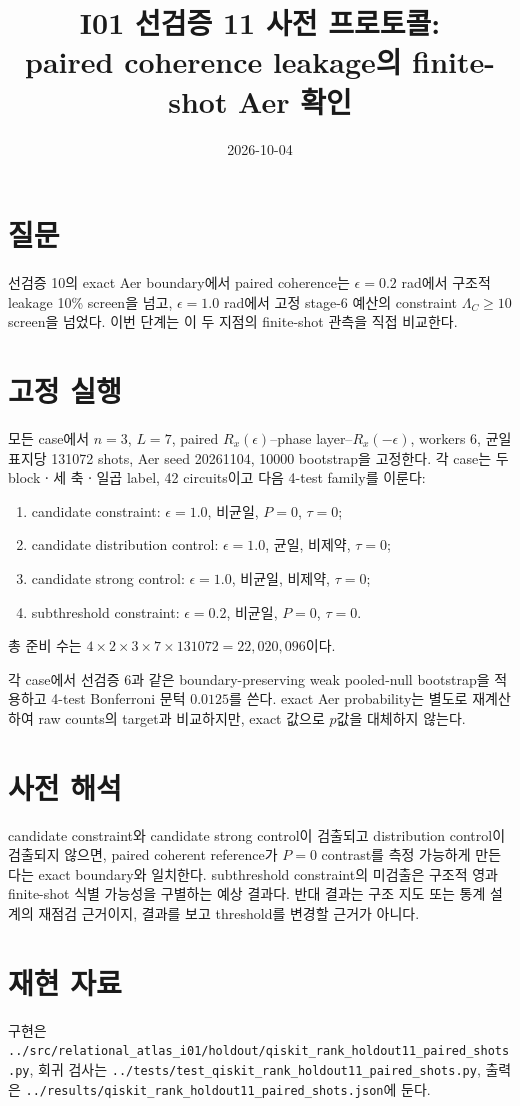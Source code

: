\documentclass[11pt]{article}
\begin{document}
\title{I01 선검증 11 사전 프로토콜:\\
paired coherence leakage의 finite-shot Aer 확인}
\date{2026-10-04}
\maketitle

\section*{질문}
선검증 10의 exact Aer boundary에서 paired coherence는 $\epsilon=0.2$ rad에서
구조적 leakage 10\% screen을 넘고, $\epsilon=1.0$ rad에서 고정 stage-6 예산의
constraint $\Lambda_C\ge10$ screen을 넘었다. 이번 단계는 이 두 지점의
finite-shot 관측을 직접 비교한다.

\section*{고정 실행}
모든 case에서 $n=3$, $L=7$, paired
$R_x(\epsilon)$--phase layer--$R_x(-\epsilon)$, workers 6, 균일 표지당
131072 shots, Aer seed 20261104, 10000 bootstrap을 고정한다. 각 case는
두 blockㆍ세 축ㆍ일곱 label, 42 circuits이고 다음 4-test family를 이룬다:
\begin{enumerate}
\item candidate constraint: $\epsilon=1.0$, 비균일, $P=0$, $\tau=0$;
\item candidate distribution control: $\epsilon=1.0$, 균일, 비제약, $\tau=0$;
\item candidate strong control: $\epsilon=1.0$, 비균일, 비제약, $\tau=0$;
\item subthreshold constraint: $\epsilon=0.2$, 비균일, $P=0$, $\tau=0$.
\end{enumerate}
총 준비 수는 $4\times2\times3\times7\times131072=22{,}020{,}096$이다.

각 case에서 선검증 6과 같은 boundary-preserving weak pooled-null bootstrap을
적용하고 4-test Bonferroni 문턱 $0.0125$를 쓴다. exact Aer probability는
별도로 재계산하여 raw counts의 target과 비교하지만, exact 값으로 $p$값을
대체하지 않는다.

\section*{사전 해석}
candidate constraint와 candidate strong control이 검출되고 distribution control이
검출되지 않으면, paired coherent reference가 $P=0$ contrast를 측정 가능하게
만든다는 exact boundary와 일치한다. subthreshold constraint의 미검출은
구조적 영과 finite-shot 식별 가능성을 구별하는 예상 결과다. 반대 결과는
구조 지도 또는 통계 설계의 재점검 근거이지, 결과를 보고 threshold를 변경할
근거가 아니다.

\section*{재현 자료}
구현은 \texttt{../src/relational\_atlas\_i01/holdout/qiskit\_rank\_holdout11\_paired\_shots.py},
회귀 검사는 \texttt{../tests/test\_qiskit\_rank\_holdout11\_paired\_shots.py},
출력은 \texttt{../results/qiskit\_rank\_holdout11\_paired\_shots.json}에 둔다.
\end{document}
